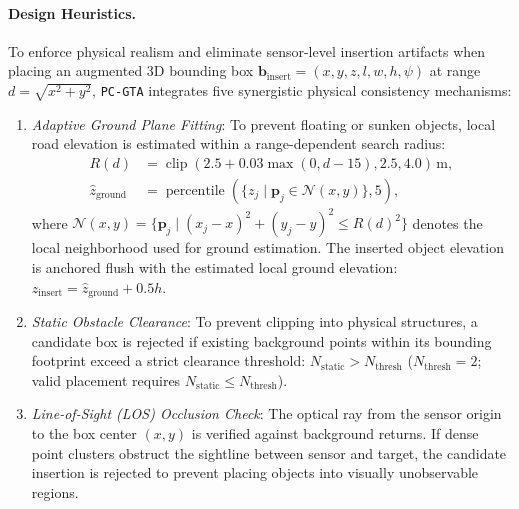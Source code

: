 \paragraph{Design Heuristics.}
To enforce physical realism and eliminate sensor-level insertion artifacts when placing an augmented 3D bounding box $\mathbf{b}_{\mathrm{insert}} = (x, y, z, l, w, h, \psi)$ at range $d = \sqrt{x^2 + y^2}$, \texttt{PC-GTA} integrates five synergistic physical consistency mechanisms:
\begin{enumerate}
\item \textit{Adaptive Ground Plane Fitting}: To prevent floating or sunken objects, local road elevation is estimated within a range-dependent search radius:
\begin{align}
    R(d) &= \operatorname{clip}(2.5 + 0.03\max(0, d - 15), 2.5, 4.0)\,\mathrm{m},\nonumber\\[0.8em]
    \hat{z}_{\mathrm{ground}} &= \operatorname{percentile}(\{z_j \mid \mathbf{p}_j \in \mathcal{N}(x, y)\}, 5),
    \label{eq:ground_fitting}
\end{align}
where $\mathcal{N}(x, y) = \{\mathbf{p}_j \mid (x_j - x)^2 + (y_j - y)^2 \le R(d)^2\}$ denotes the local neighborhood used for ground estimation.
The inserted object elevation is anchored flush with the estimated local ground elevation: $z_{\mathrm{insert}} = \hat{z}_{\mathrm{ground}} + 0.5h$.

\item \textit{Static Obstacle Clearance}: To prevent clipping into physical structures, a candidate box is rejected if existing background points within its bounding footprint exceed a strict clearance threshold: $N_{\mathrm{static}} > N_{\mathrm{thresh}}$ ($N_{\mathrm{thresh}} = 2$; valid placement requires $N_{\mathrm{static}} \le N_{\mathrm{thresh}}$).

\item \textit{Line-of-Sight (LOS) Occlusion Check}: The optical ray from the sensor origin to the box center $(x, y)$ is verified against background returns. If dense point clusters obstruct the sightline between sensor and target, the candidate insertion is rejected to prevent placing objects into visually unobservable regions.


\end{enumerate}
